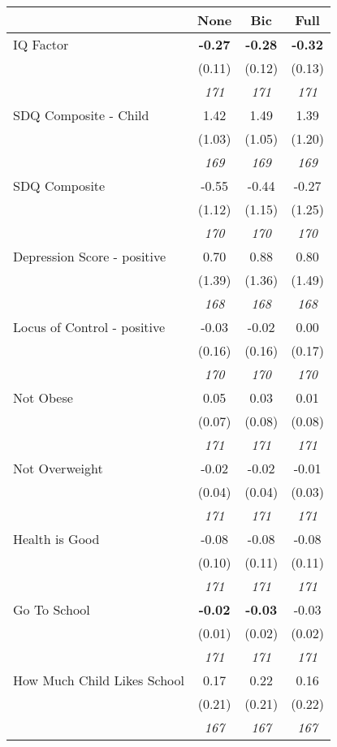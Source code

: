 \begin{tabular}{l c c c}
\toprule
 & None & Bic & Full \\
\midrule
IQ Factor & \textbf{ -0.27 } & \textbf{ -0.28 } & \textbf{ -0.32 } \\
& (0.11) & (0.12) & (0.13) \\
& \textit{ 171 } & \textit{ 171 } & \textit{ 171 } \\
SDQ Composite - Child & 1.42 & 1.49 & 1.39 \\
& (1.03) & (1.05) & (1.20) \\
& \textit{ 169 } & \textit{ 169 } & \textit{ 169 } \\
SDQ Composite & -0.55 & -0.44 & -0.27 \\
& (1.12) & (1.15) & (1.25) \\
& \textit{ 170 } & \textit{ 170 } & \textit{ 170 } \\
Depression Score - positive & 0.70 & 0.88 & 0.80 \\
& (1.39) & (1.36) & (1.49) \\
& \textit{ 168 } & \textit{ 168 } & \textit{ 168 } \\
Locus of Control - positive & -0.03 & -0.02 & 0.00 \\
& (0.16) & (0.16) & (0.17) \\
& \textit{ 170 } & \textit{ 170 } & \textit{ 170 } \\
Not Obese & 0.05 & 0.03 & 0.01 \\
& (0.07) & (0.08) & (0.08) \\
& \textit{ 171 } & \textit{ 171 } & \textit{ 171 } \\
Not Overweight & -0.02 & -0.02 & -0.01 \\
& (0.04) & (0.04) & (0.03) \\
& \textit{ 171 } & \textit{ 171 } & \textit{ 171 } \\
Health is Good & -0.08 & -0.08 & -0.08 \\
& (0.10) & (0.11) & (0.11) \\
& \textit{ 171 } & \textit{ 171 } & \textit{ 171 } \\
Go To School & \textbf{ -0.02 } & \textbf{ -0.03 } & -0.03 \\
& (0.01) & (0.02) & (0.02) \\
& \textit{ 171 } & \textit{ 171 } & \textit{ 171 } \\
How Much Child Likes School & 0.17 & 0.22 & 0.16 \\
& (0.21) & (0.21) & (0.22) \\
& \textit{ 167 } & \textit{ 167 } & \textit{ 167 } \\

\end{tabular}
